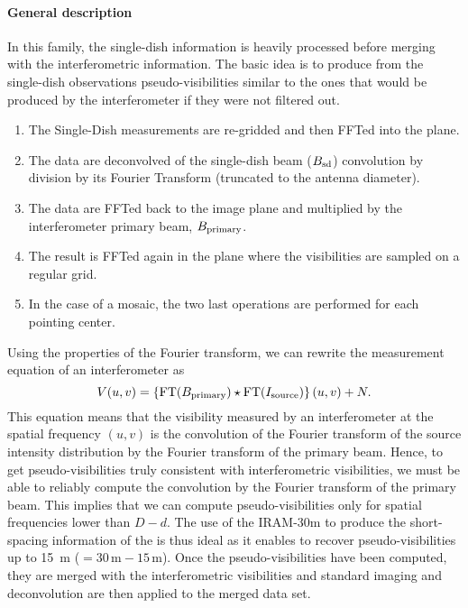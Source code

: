 \paragraph{General description}

In this family, the single-dish information is heavily processed before
merging with the interferometric information. The basic idea is to produce
from the single-dish observations pseudo-visibilities similar to the ones
that would be produced by the interferometer if they were not filtered out.
\begin{enumerate}\itemsep 0pt
\item The Single-Dish measurements are re-gridded and then FFTed into the
  \uv{} plane.
\item The data are deconvolved of the single-dish beam ($B_{\mathrm{sd}}$)
  convolution by division by its Fourier Transform (truncated to the
  antenna diameter).
\item The data are FFTed back to the image plane and multiplied by the
  interferometer primary beam, $B_{\mathrm{primary}}$.
\item The result is FFTed again in the \uv{} plane where the visibilities
  are sampled on a regular grid.
\item In the case of a mosaic, the two last operations are performed for
  each pointing center.
\end{enumerate}
Using the properties of the Fourier transform, we can rewrite the
measurement equation of an interferometer as
\begin{equation}
  V(u,v) = \displaystyle\left\{ \mbox{FT}(B_{\mathrm{primary}}) \star \mbox{FT}(I_{\mathrm{source}}) \right\}(u,v)+N.
\end{equation}
This equation means that the visibility measured by an interferometer at
the spatial frequency $(u,v)$ is the convolution of the Fourier transform
of the source intensity distribution by the Fourier transform of the
primary beam. Hence, to get pseudo-visibilities truly consistent with
interferometric visibilities, we must be able to reliably compute the
convolution by the Fourier transform of the primary beam. This implies that
we can compute pseudo-visibilities only for spatial frequencies lower than
$D-d$. The use of the IRAM-30m to produce the short-spacing information of
the \PdBI{} is thus ideal as it enables to recover pseudo-visibilities up
to 15~m ($=30\,\mbox{m}-15\,\mbox{m}$). Once the pseudo-visibilities have
been computed, they are merged with the interferometric visibilities and
standard imaging and deconvolution are then applied to the merged data set.


